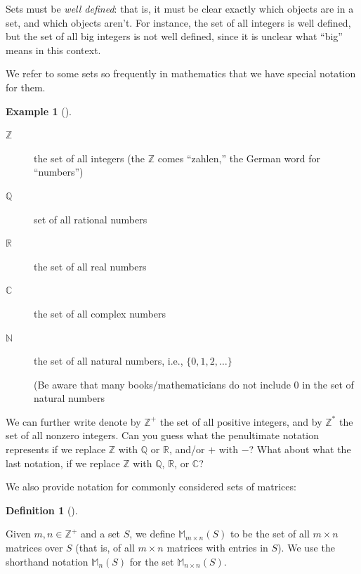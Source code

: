 \documentclass[10pt,]{book}
\theoremstyle{plain}
\theoremstyle{definition}
\newtheorem{definition}[theorem]{Definition}
\theoremstyle{definition}
\theoremstyle{definition}
\newtheorem{example}[theorem]{Example}
\theoremstyle{definition}
\numberwithin{equation}{section}
\def\Z{\mathbb{Z}}
\def\R{\mathbb{R}}
\def\Q{\mathbb{Q}}
\def\C{\mathbb{C}}
\def\N{\mathbb{N}}
\def\M{\mathbb{M}}
\begin{document}
    Sets must be \emph{well defined}: that is, it must be clear
    exactly which objects are in a set, and which objects aren't.
    For instance, the set of all integers is well defined, but the
    set of all big integers is not well defined, since it is
    unclear what ``big'' means in this context.
\par

    We refer to some sets so frequently in mathematics that we have special notation for them.
\begin{example}[]\label{example-1}

\leavevmode%
\begin{description}
\item[{\(\Z\)}]\hypertarget{li-1}{}the set of all integers  (the \(\Z\) comes ``zahlen,'' the German word for ``numbers'')%
\item[{\(\Q\)}]\hypertarget{li-2}{}set of all rational numbers%
\item[{\(\R\)}]\hypertarget{li-3}{}the set of all real numbers%
\item[{\(\C\)}]\hypertarget{li-4}{}the set of all complex numbers%
\item[{\(\N\)}]\hypertarget{li-5}{}the set of all natural numbers, i.e., \(\{0, 1, 2, \ldots\}\)%
\par
 (Be aware that many books/mathematicians do not include \(0\) in the set of natural numbers%
\end{description}

We can further write denote by \(\Z^+\) the set of all positive integers, and by \(\Z^*\) the set of all nonzero integers.
Can you guess what the penultimate notation represents if we replace \(\Z\) with \(\Q\) or \(\R\), and/or \(+\) with \(-\)? What about 
what the last notation, if we replace \(\Z\) with \(\Q\), \(\R\), or \(\C\)?
%
\label{notation-4}
\label{notation-5}
\label{notation-6}
\label{notation-7}
\label{notation-8}
\label{notation-9}
\label{notation-10}
\label{notation-11}
\end{example}
\par

    We also provide notation for commonly considered sets of matrices:
\begin{definition}[{}]\label{definition-3}

 Given \(m,n\in \Z^+\) and a set \(S\), we define \(\M_{m\times n}(S)\) to
    be the set of all \(m\times n\) matrices over \(S\) (that is, of all \(m\times n\) matrices with entries in \(S\)). We use the
    shorthand notation \(\M_n(S)\) for the set \(\M_{n\times n}(S)\).\label{notation-12}
\label{notation-13}
\end{definition}
\par
\end{document}
